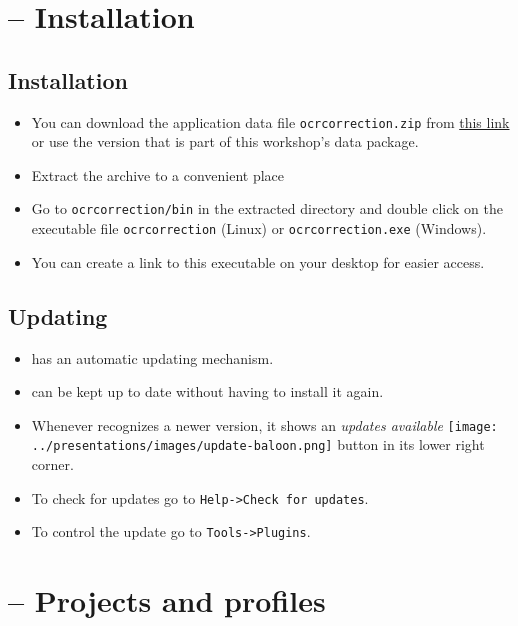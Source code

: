 \section{\pocoto{} -- Installation}
\subsection{Installation}
\begin{frame}
	\begin{itemize}
		\item You can download the application data file \texttt{ocrcorrection.zip}
			from \href{http://www.cis.lmu.de/ocrworkshop/pocoto/}{this link} or use
			the version that is part of this workshop's data package.
		\item Extract the archive to a convenient place
		\item Go to \texttt{ocrcorrection/bin} in the extracted directory and double click
			on the executable file \texttt{ocrcorrection} (Linux) or
			\texttt{ocrcorrection.exe} (Windows).
		\item You can create a link to this executable on your desktop for
			easier access.
	\end{itemize}
\end{frame}

\subsection{Updating}
\begin{frame}
	\begin{itemize}
		\item \pocoto{} has an automatic updating mechanism.
		\item \pocoto{} can be kept up to date without having to install it again.
		\item Whenever \pocoto recognizes a newer version, it shows an \emph{updates
			available} \texttt{[image: ../presentations/images/update-baloon.png]}
			button in its lower right corner.
		\item To check for updates go to \texttt{Help->Check for updates}.
		\item To control the update go to \texttt{Tools->Plugins}.
	\end{itemize}
\end{frame}

\section{\pocoto{} -- Projects and profiles}
